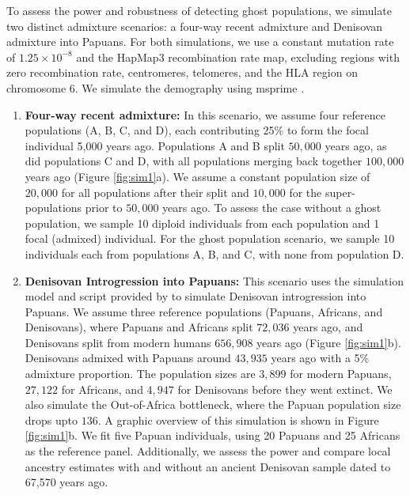 To assess the power and robustness of detecting ghost populations, we simulate two distinct admixture scenarios: a four-way recent admixture and Denisovan admixture into Papuans. For both simulations, we use a constant mutation rate of $1.25 \times 10^{-8}$ and the HapMap3 recombination rate map, excluding regions with zero recombination rate, centromeres, telomeres, and the HLA region on chromosome 6. We simulate the demography using msprime \cite{kelleher2016efficient}.

\begin{enumerate}
    \item \textbf{Four-way recent admixture:} In this scenario, we assume four reference populations (A, B, C, and D), each contributing 25\% to form the focal individual 5,000 years ago. Populations A and B split $50{,}000$ years ago, as did populations C and D, with all populations merging back together $100{,}000$ years ago (Figure \ref{fig:sim1}a). We assume a constant population size of $20,000$ for all populations after their split and $10{,}000$ for the super-populations prior to $50{,}000$ years ago. To assess the case without a ghost population, we sample 10 diploid individuals from each population and 1 focal (admixed) individual. For the ghost population scenario, we sample 10 individuals each from populations A, B, and C, with none from population D. 
    
    \item \textbf{Denisovan Introgression into Papuans:} This scenario uses the simulation model and script provided by \cite{skov2018detecting} to simulate Denisovan introgression into Papuans. We assume three reference populations (Papuans, Africans, and Denisovans), where Papuans and Africans split $72{,}036$ years ago, and Denisovans split from modern humans $656{,}908$ years ago (Figure \ref{fig:sim1}b). Denisovans admixed with Papuans around $43{,}935$ years ago with a 5\% admixture proportion. The population sizes are $3,899$ for modern Papuans, $27{,}122$ for Africans, and $4{,}947$ for Denisovans before they went extinct. We also simulate the Out-of-Africa bottleneck, where the Papuan population size drops upto $136$. A graphic overview of this simulation is shown in Figure \ref{fig:sim1}b. We fit five Papuan individuals, using 20 Papuans and 25 Africans as the reference panel. Additionally, we assess the power and compare local ancestry estimates with and without an ancient Denisovan sample dated to 67,570 years ago.    
\end{enumerate}

